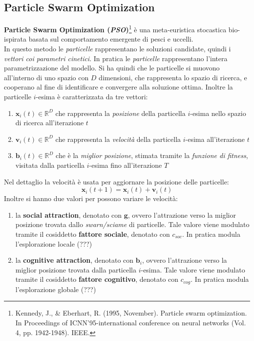 \documentclass[a4paper,12pt, oneside]{book}
\begin{document}
\subsection{Particle Swarm Optimization}
\textbf{Particle Swarm Optimization (\textit{PSO})}\footnote{Kennedy, J., \&
  Eberhart, R. (1995, November). Particle swarm optimization. In Proceedings of
  ICNN'95-international conference on neural networks (Vol. 4,
  pp. 1942-1948). IEEE.} è una meta-euristica 
stocastica bio-ispirata basata sul comportamento emergente di pesci e uccelli.\\
In questo metodo le \textit{particelle} rappresentano le soluzioni candidate,
quindi i \textit{vettori coi parametri cinetici}. In pratica le
\textit{particelle} rappresentano l'intera parametrizzazione del modello. Si ha
quindi che le particelle si muovono all'interno di uno spazio con $D$
dimensioni, che rappresenta lo spazio di ricerca, e cooperano al fine di
identificare e convergere alla soluzione ottima. Inoltre la particelle $i$-esima
è caratterizzata da tre vettori:
\begin{enumerate}
  \item $\mathbf{x}_i(t)\in\mathbb{R}^D$ che rappresenta la \textit{posizione}
  della particella  
  $i$-esima nello spazio di ricerca all'iterazione $t$
  \item $\mathbf{v}_i(t)\in\mathbb{R}^D$ che rappresenta la \textit{velocità}
  della particella $i$-esima all'iterazione $t$
  \item $\mathbf{b}_i(t)\in\mathbb{R}^D$ che è la \textit{miglior posizione},
  stimata tramite la \textit{funzione di fitness}, visitata dalla particella
  $i$-esima fino all'iterazione $T$
\end{enumerate}
Nel dettaglio la velocità è usata per aggiornare la posizione delle particelle:
\[\mathbf{x}_i(t+1)=\mathbf{x}_i(t)+\mathbf{v}_i(t)\]
Inoltre si hanno due valori per possono variare le velocità:
\begin{enumerate}
  \item la \textbf{social attraction}, denotato con $\mathbf{g}$, ovvero
  l'attrazione verso la miglior 
  posizione trovata dallo \textit{swarn/sciame} di particelle. Tale valore viene
  modulato tramite il cosiddetto \textbf{fattore sociale}, denotato con
  $c_{soc}$. In pratica modula l'esplorazione locale (???)
  \item la \textbf{cognitive attraction}, denotato con $\mathbf{b}_i$, ovvero
  l'attrazione verso la miglior posizione trovata dalla particella
  $i$-esima. Tale valore viene 
  modulato tramite il cosiddetto \textbf{fattore cognitivo}, denotato con
  $c_{cog}$. In pratica modula l'esplorazione globale (???)
\end{enumerate}
\end{document}
